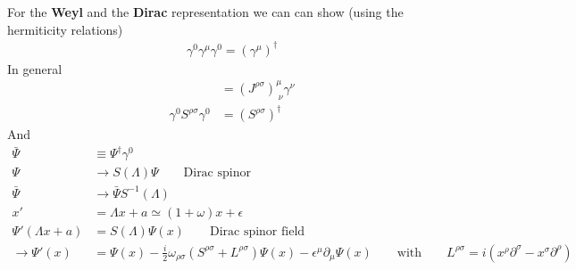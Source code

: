 \documentclass[10pt,a4paper]{report}
\theoremstyle{definition}
\begin{document}
\begin{itemize}
\end{itemize}



For the {\bf Weyl} and the {\bf Dirac} representation we can can show (using the hermiticity relations)
\begin{align}
\gamma^0\gamma^\mu\gamma^0=(\gamma^\mu)^\dagger
\end{align}
In general
\begin{align}
[\gamma^\mu,S^{\rho\sigma}]&=(J^{\rho\sigma})^\mu_{\;\nu}\gamma^\nu\\
\gamma^0S^{\rho\sigma}\gamma^0&=(S^{\rho\sigma})^\dagger
\end{align}
And
\begin{align}
\bar{\Psi}&\equiv\Psi^\dagger\gamma^0\\
\Psi&\rightarrow S(\Lambda)\Psi\qquad\text{Dirac spinor}\\
\bar{\Psi}&\rightarrow \bar{\Psi}S^{-1}(\Lambda)\\
x'&=\Lambda x+a\simeq (1+\omega)x+\epsilon\\
\Psi'(\Lambda x+a)
&=S(\Lambda)\Psi(x)\qquad\text{Dirac spinor field}\\
\rightarrow \Psi'(x)
&=\Psi(x)-\frac{i}{2}\omega_{\rho\sigma}\left(S^{\rho\sigma}+L^{\rho\sigma}\right)\Psi(x)-\epsilon^\mu\partial_\mu\Psi(x)\qquad\text{with}\qquad L^{\rho\sigma}=i(x^\rho\partial^\sigma-x^\sigma\partial^\rho)
\end{align}
\end{document}
